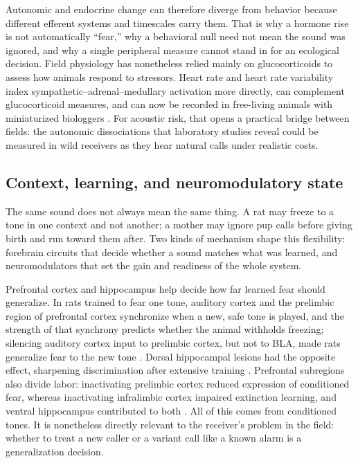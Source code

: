 Autonomic and endocrine change can therefore diverge from behavior because different efferent systems and timescales carry them. That is why a hormone rise is not automatically ``fear,'' why a behavioral null need not mean the sound was ignored, and why a single peripheral measure cannot stand in for an ecological decision. Field physiology has nonetheless relied mainly on glucocorticoids to assess how animals respond to stressors. Heart rate and heart rate variability index sympathetic--adrenal--medullary activation more directly, can complement glucocorticoid measures, and can now be recorded in free-living animals with miniaturized biologgers \citep{GaidicaDantzer2020}. For acoustic risk, that opens a practical bridge between fields: the autonomic dissociations that laboratory studies reveal could be measured in wild receivers as they hear natural calls under realistic costs.

\subsection{Context, learning, and neuromodulatory state}
\label{sec:mechanisms-state}

The same sound does not always mean the same thing. A rat may freeze to a tone in one context and not another; a mother may ignore pup calls before giving birth and run toward them after. Two kinds of mechanism shape this flexibility: forebrain circuits that decide whether a sound matches what was learned, and neuromodulators that set the gain and readiness of the whole system.

Prefrontal cortex and hippocampus help decide how far learned fear should generalize. In rats trained to fear one tone, auditory cortex and the prelimbic region of prefrontal cortex synchronize when a new, safe tone is played, and the strength of that synchrony predicts whether the animal withholds freezing; silencing auditory cortex input to prelimbic cortex, but not to BLA, made rats generalize fear to the new tone \citep{ConcinaEtAl2018}. Dorsal hippocampal lesions had the opposite effect, sharpening discrimination after extensive training \citep{QuinnEtAl2009}. Prefrontal subregions also divide labor: inactivating prelimbic cortex reduced expression of conditioned fear, whereas inactivating infralimbic cortex impaired extinction learning, and ventral hippocampus contributed to both \citep{SierraMercadoEtAl2011}. All of this comes from conditioned tones. It is nonetheless directly relevant to the receiver's problem in the field: whether to treat a new caller or a variant call like a known alarm is a generalization decision.


